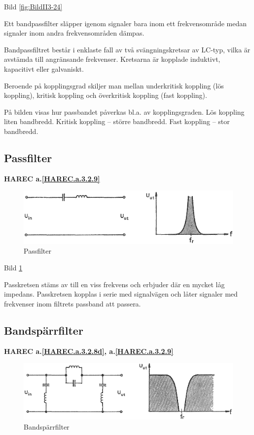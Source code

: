 Bild \ref{fig:BildII3-24}

Ett bandpassfilter släpper igenom signaler bara inom ett frekvensområde medan
signaler inom andra frekvensområden dämpas.

Bandpassfiltret består i enklaste fall av två svängningskretsar av LC-typ, vilka
är avstämda till angränsande frekvenser. Kretsarna är kopplade induktivt,
kapacitivt eller galvaniskt.

Beroende på kopplingsgrad skiljer man mellan underkritisk koppling (lös
koppling), kritisk koppling och överkritisk koppling (fast koppling).

På bilden visas hur passbandet påverkas bl.a. av kopplingsgraden. Lös koppling
liten bandbredd. Kritisk koppling -- större bandbredd. Fast koppling -- stor
bandbredd.

\subsection{Passfilter}
\textbf{HAREC
  a.\ref{HAREC.a.3.2.9}\label{myHAREC.a.3.2.9d}
}

\begin{figure}
\includegraphics[width=\textwidth]{images/bild_2_3-25.png}
\caption{Passfilter}
\label{fig:BildII3-25}
\end{figure}

Bild \ref{fig:BildII3-25}

Passkretsen stäms av till en viss frekvens och erbjuder där en mycket låg
impedans. Passkretsen kopplas i serie med signalvägen och låter signaler med
frekvenser inom filtrets passband att passera.

\subsection{Bandspärrfilter}
\textbf{HAREC
  a.\ref{HAREC.a.3.2.8d}\label{myHAREC.a.3.2.8d},
  a.\ref{HAREC.a.3.2.9}\label{myHAREC.a.3.2.9e}
}

\begin{figure}
\includegraphics[width=\textwidth]{images/bild_2_3-26.png}
\caption{Bandspärrfilter}
\label{fig:BildII3-26}
\end{figure}

